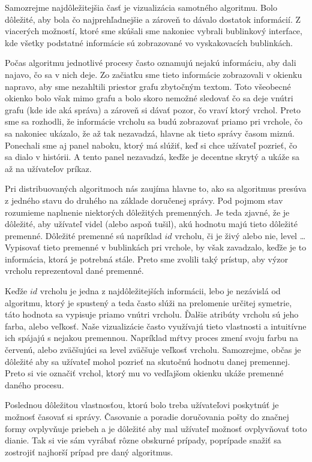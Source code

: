 Samozrejme najdôležitejšia časť je vizualizácia samotného algoritmu. Bolo dôležité, aby bola čo
najprehľadnejšie a zároveň to dávalo dostatok informácií. Z viacerých možností, ktoré sme skúšali
sme nakoniec vybrali bublinkový interface, kde všetky podstatné informácie sú zobrazované vo
vyskakovacích bublinkách.

Počas algoritmu jednotlivé procesy často oznamujú nejakú informáciu, aby dali najavo, čo sa v nich
deje. Zo začiatku sme tieto informácie zobrazovali v okienku napravo, aby sme nezahltili priestor
grafu zbytočným textom. Toto všeobecné okienko bolo však mimo grafu a bolo skoro nemožné sledovať
čo sa deje vnútri grafu (kde ide aká správa) a zároveň si dávať pozor, čo vraví ktorý vrchol. Preto
sme sa rozhodli, že informácie vrcholu sa budú zobrazovať priamo pri vrchole, čo sa
nakoniec ukázalo, že až tak nezavadzá, hlavne ak tieto správy časom miznú. Ponechali sme aj
panel naboku, ktorý má slúžiť, keď si chce užívateľ pozrieť, čo sa dialo v histórii. A tento panel
nezavadzá, keďže je decentne skrytý a ukáže sa až na užívateľov príkaz.

Pri distribuovaných algoritmoch nás zaujíma hlavne to, ako sa algoritmus presúva z jedného stavu do
druhého na základe doručenej správy. Pod pojmom stav rozumieme naplnenie niektorých dôležitých
premenných. Je teda zjavné, že je dôležité, aby užívateľ videl (alebo aspoň tušil), akú hodnotu majú
tieto dôležité premenné. Dôležité premenné sú napríklad $id$ vrcholu, či je živý alebo nie, 
level \dots Vypisovať tieto premenné v bublinkách pri vrchole, by však zavadzalo, keďže je to
informácia, ktorá je potrebná stále. Preto sme zvolili taký prístup, aby výzor vrcholu reprezentoval
dané premenné.

Keďže $id$ vrcholu je jedna z najdôležitejších informácii, lebo je nezávislá od algoritmu, ktorý je
spustený a teda často slúži na prelomenie určitej symetrie, táto hodnota sa vypisuje priamo vnútri
vrcholu. Ďalšie atribúty vrcholu sú jeho farba, alebo veľkosť. Naše vizualizácie často
využívajú tieto vlastnosti a intuitívne ich spájajú s nejakou premennou. Napríklad mŕtvy proces zmení
svoju farbu na červenú, alebo zväčšujúci sa level zväčšuje veľkosť vrcholu.
Samozrejme, občas je dôležité aby sa užívateľ mohol pozrieť na skutočnú hodnotu danej premennej.
Preto si vie označiť vrchol, ktorý mu vo vedľajšom okienku ukáže premenné daného procesu.

Poslednou dôležitou vlastnosťou, ktorú bolo treba užívateľovi poskytnúť je možnosť časovať si
správy. Časovanie a poradie doručovania pošty do značnej formy ovplyvňuje priebeh a je dôležité aby
mal užívateľ možnosť ovplyvňovať toto dianie. Tak si vie sám vyrábať rôzne obskurné prípady,
poprípade snažiť sa zostrojiť najhorší prípad pre daný algoritmus.

